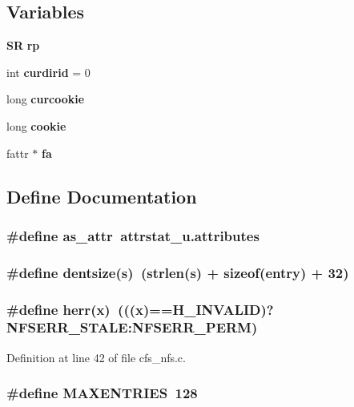 \subsection*{Variables}
\begin{CompactItemize}
\item 
{\bf SR} {\bf rp}
\item 
int {\bf curdirid} = 0
\item 
long {\bf curcookie}
\item 
long {\bf cookie}
\item 
fattr $\ast$ {\bf fa}
\end{CompactItemize}


\subsection{Define Documentation}
\subsubsection{\setlength{\rightskip}{0pt plus 5cm}\#define as\_\-attr\ attrstat\_\-u.attributes}\label{cfs__nfs_8c_a1}


\subsubsection{\setlength{\rightskip}{0pt plus 5cm}\#define dentsize({\bf s})\ (strlen({\bf s}) + sizeof(entry) + 32)}\label{cfs__nfs_8c_a4}


\subsubsection{\setlength{\rightskip}{0pt plus 5cm}\#define herr(x)\ (((x)==H\_\-INVALID)?NFSERR\_\-STALE:NFSERR\_\-PERM)}\label{cfs__nfs_8c_a0}




Definition at line 42 of file cfs\_\-nfs.c.
\subsubsection{\setlength{\rightskip}{0pt plus 5cm}\#define MAXENTRIES\ 128}\label{cfs__nfs_8c_a2}


